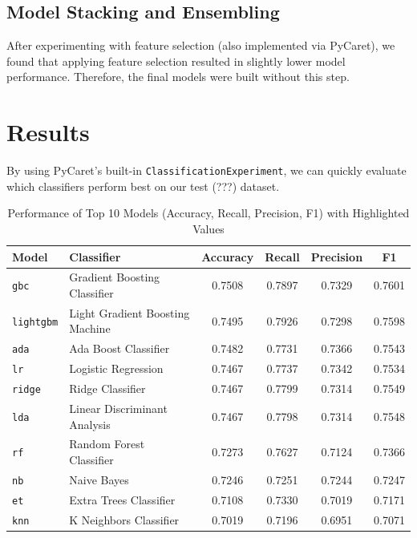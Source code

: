 \documentclass[a4paper,12pt]{article}
\begin{document}
\subsection{Model Stacking and Ensembling}
After experimenting with feature selection (also implemented via PyCaret), we found that applying 
feature selection resulted in slightly lower model performance. Therefore, the final models were 
built without this step.

\section{Results}
By using PyCaret's built-in \texttt{ClassificationExperiment}, we can quickly evaluate which classifiers perform best on our test (???) dataset.

\begin{table}[h!]
\centering
\begin{tabular}{l l c c c c}
\toprule
\textbf{Model} & \textbf{Classifier} & \textbf{Accuracy} & \textbf{Recall} & \textbf{Precision} & \textbf{F1} \\
\midrule
\texttt{gbc} & Gradient Boosting Classifier & \cellcolor{yellow}0.7508 & 0.7897 & 0.7329 & \cellcolor{yellow}0.7601 \\
\texttt{lightgbm} & Light Gradient Boosting Machine & 0.7495 & \cellcolor{yellow}0.7926 & 0.7298 & 0.7598 \\
\texttt{ada} & Ada Boost Classifier & 0.7482 & 0.7731 & \cellcolor{yellow}0.7366 & 0.7543 \\
\texttt{lr} & Logistic Regression & 0.7467 & 0.7737 & 0.7342 & 0.7534 \\
\texttt{ridge} & Ridge Classifier & 0.7467 & 0.7799 & 0.7314 & 0.7549 \\
\texttt{lda} & Linear Discriminant Analysis & 0.7467 & 0.7798 & 0.7314 & 0.7548 \\
\texttt{rf} & Random Forest Classifier & 0.7273 & 0.7627 & 0.7124 & 0.7366 \\
\texttt{nb} & Naive Bayes & 0.7246 & 0.7251 & 0.7244 & 0.7247 \\
\texttt{et} & Extra Trees Classifier & 0.7108 & 0.7330 & 0.7019 & 0.7171 \\
\texttt{knn} & K Neighbors Classifier & 0.7019 & 0.7196 & 0.6951 & 0.7071 \\
\bottomrule
\end{tabular}
\caption{Performance of Top 10 Models (Accuracy, Recall, Precision, F1) with Highlighted Values}
\label{tab:model_performance}
\end{table}
\end{document}
